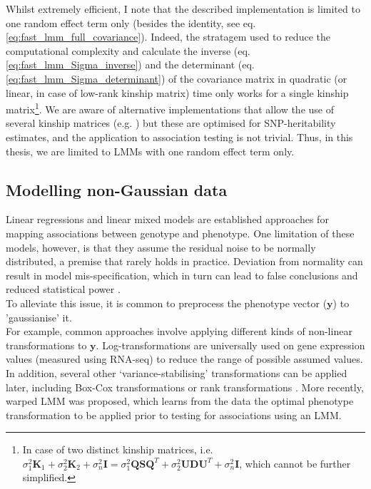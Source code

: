 Whilst extremely efficient, I note that the described implementation is limited to one random effect term only (besides the identity, see eq. \eqref{eq:fast_lmm_full_covariance}).
Indeed, the stratagem used to reduce the computational complexity and calculate the inverse (eq. \eqref{eq:fast_lmm_Sigma_inverse}) and the determinant (eq. \eqref{eq:fast_lmm_Sigma_determinant}) of the covariance matrix in quadratic (or linear, in case of low-rank kinship matrix) time only works for a single kinship matrix\footnote{In case of two distinct kinship matrices, i.e. $\sigma_1^2\mathbf{K}_1 + \sigma_2^2\mathbf{K}_2 + \sigma_n^2\mathbf{I} = \sigma_1^2\mathbf{Q}\mathbf{S}\mathbf{Q}^T + \sigma_2^2\mathbf{U}\mathbf{D}\mathbf{U}^T + \sigma_n^2\mathbf{I}$, which cannot be further simplified.}.
We are aware of alternative implementations that allow the use of several kinship matrices (e.g. \cite{pazokitoroudi2020efficient}) but these are optimised for SNP-heritability estimates, and the application to association testing is not trivial.
Thus, in this thesis, we are limited to LMMs with one random effect term only.




\subsection{Modelling non-Gaussian data}
\label{sec:non_gaussian}

Linear regressions and linear mixed models are established approaches for mapping associations between genotype and phenotype. 
One limitation of these models, however, is that they assume the residual noise to be normally distributed, a premise that rarely holds in practice. 
Deviation from normality can result in model mis-specification, which in turn can lead to false conclusions and reduced statistical power \cite{mcculloch2014generalized}.  \\

To alleviate this issue, it is common to preprocess the phenotype vector ($\mathbf{y}$) to 'gaussianise' it. 
\\

For example, common approaches involve applying different kinds of non-linear transformations to $\mathbf{y}$. 
Log-transformations are universally used on gene expression values (measured using RNA-seq) to reduce the range of possible assumed values.
In addition, several other `variance-stabilising' transformations can be applied later, including Box-Cox transformations \cite{box1964analysis} or rank transformations \cite{zhou2014efficient}.
More recently, warped LMM \cite{fusi2014warped} was proposed, which learns from the data the optimal phenotype transformation to be applied prior to testing for associations using an LMM. 
\\


